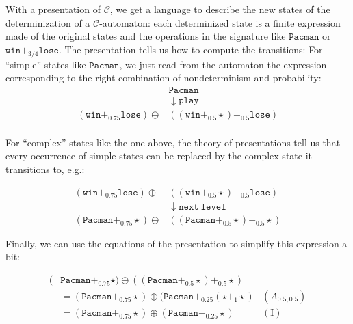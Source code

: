 \documentclass{article}
\newcommand{\Th}{\mathtt{Th}}
\begin{document}
With a presentation of $\mathcal C$, we get a language to describe the new states of the determinization of a $\mathcal C$-automaton: each determinized state is a finite expression made of the original states and the operations in the signature like  $\mathtt{Pacman}$ or $\mathtt{win} +_{3/4} \mathtt{lose}$. The presentation tells us how to compute the transitions:
For ``simple'' states like $\mathtt{Pacman}$, we just read from the automaton the expression corresponding to the right combination of nondeterminism and probability:
 \begin{align*}
     &\mathtt{Pacman}\\
    &\downarrow \mathtt{play}\\
    (\mathtt{win} +_{0.75} \mathtt{lose}) \oplus  &((\mathtt{win} +_{0.5} \star) +_{0.5} \mathtt{lose})\\ 
\end{align*}

For ``complex'' states like the one above, the theory of presentations tell us that  %
every occurrence of simple states can be replaced by the complex state it transitions to, e.g.:

\begin{align*}
    (\mathtt{win} +_{0.75} \mathtt{lose}) \oplus  &((\mathtt{win} +_{0.5} \star) +_{0.5} \mathtt{lose})\\
    & \downarrow \mathtt{next\ level}\\
    (\mathtt{Pacman} +_{0.75} \star) \oplus  &((\mathtt{Pacman} +_{0.5} \star) +_{0.5} \star)
\end{align*}

Finally, we can use the equations of the presentation to simplify this expression a bit:

\begin{align*}
    (&\mathtt{Pacman} +_{0.75} \star) \oplus  ((\mathtt{Pacman} +_{0.5} \star) +_{0.5} \star)\\
    &= (\mathtt{Pacman} +_{0.75} \star) \oplus  (\mathtt{Pacman} +_{0.25} (\star +_{1} \star) & ({A}_{0.5, 0.5})\\
    &= (\mathtt{Pacman} +_{0.75} \star) \oplus (\mathtt{Pacman} +_{0.25} \star) & (\text{I})
\end{align*} 


\end{document}
